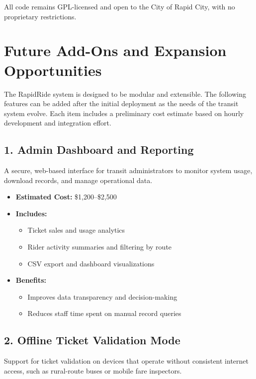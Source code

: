 \documentclass[12pt]{article}
\begin{document}
All code remains GPL-licensed and open to the City of Rapid City, with no proprietary restrictions.

\section{Future Add-Ons and Expansion Opportunities}

The RapidRide system is designed to be modular and extensible. The following features can be added after the initial deployment as the needs of the transit system evolve. Each item includes a preliminary cost estimate based on hourly development and integration effort.

\subsection*{1. Admin Dashboard and Reporting}

A secure, web-based interface for transit administrators to monitor system usage, download records, and manage operational data.

\begin{itemize}
    \item \textbf{Estimated Cost:} \$1,200–\$2,500
    \item \textbf{Includes:}
    \begin{itemize}
        \item Ticket sales and usage analytics
        \item Rider activity summaries and filtering by route
        \item CSV export and dashboard visualizations
    \end{itemize}
    \item \textbf{Benefits:}
    \begin{itemize}
        \item Improves data transparency and decision-making
        \item Reduces staff time spent on manual record queries
    \end{itemize}
\end{itemize}

\subsection*{2. Offline Ticket Validation Mode}

Support for ticket validation on devices that operate without consistent internet access, such as rural-route buses or mobile fare inspectors.
\end{document}
